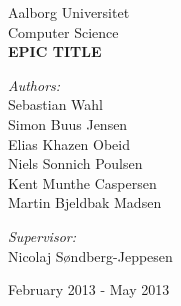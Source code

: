 \begin{titlingpage}
\color{fpcolor}
\centering
\vspace*{1.0cm}

\LARGE Aalborg Universitet\\[0.75cm]
\Large Computer Science\\[1.75cm]

\vspace{2.0cm}
{ \fontsize{70.2pt}{70.2pt} \bfseries {} EPIC TITLE}
\vspace{0.5cm}
\vspace{0.75cm}

\begin{minipage}{13.37cm}
  \begin{flushleft} \large
    \vspace{0pt}
    \emph{Authors:}\\
    Sebastian Wahl\\
    Simon Buus Jensen\\
    Elias Khazen Obeid\\
    Niels Sonnich Poulsen\\
    Kent Munthe Caspersen\\
    Martin Bjeldbak Madsen\\
  \end{flushleft}

  \begin{flushright} \large
    \vspace{-112pt}
    \emph{Supervisor:}\\
    Nicolaj Søndberg-Jeppesen
  \end{flushright}
\end{minipage}

\vfill

{\large February 2013 - May 2013}

\end{titlingpage}
